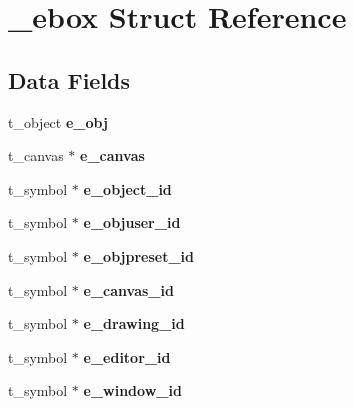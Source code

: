 \hypertarget{struct__ebox}{\section{\-\_\-ebox Struct Reference}
\label{struct__ebox}
}
\subsection*{Data Fields}
\begin{DoxyCompactItemize}
\item 
\hypertarget{struct__ebox_a337dd8dd1771ebe57e90886d4fdfe92d}{t\-\_\-object {\bfseries e\-\_\-obj}}\label{struct__ebox_a337dd8dd1771ebe57e90886d4fdfe92d}

\item 
\hypertarget{struct__ebox_ae2572dc1da66f274bc25b4bec1cbd08a}{t\-\_\-canvas $\ast$ {\bfseries e\-\_\-canvas}}\label{struct__ebox_ae2572dc1da66f274bc25b4bec1cbd08a}

\item 
\hypertarget{struct__ebox_a58e35b68d10bf20876e94cbb9bf8e8c4}{t\-\_\-symbol $\ast$ {\bfseries e\-\_\-object\-\_\-id}}\label{struct__ebox_a58e35b68d10bf20876e94cbb9bf8e8c4}

\item 
\hypertarget{struct__ebox_af4da8e9640bcf8e2be7004a5f0e0007c}{t\-\_\-symbol $\ast$ {\bfseries e\-\_\-objuser\-\_\-id}}\label{struct__ebox_af4da8e9640bcf8e2be7004a5f0e0007c}

\item 
\hypertarget{struct__ebox_a221f87b86e273092ba153465dbd8375f}{t\-\_\-symbol $\ast$ {\bfseries e\-\_\-objpreset\-\_\-id}}\label{struct__ebox_a221f87b86e273092ba153465dbd8375f}

\item 
\hypertarget{struct__ebox_afc954e0b6c201ccc39c6cbb4624b53b4}{t\-\_\-symbol $\ast$ {\bfseries e\-\_\-canvas\-\_\-id}}\label{struct__ebox_afc954e0b6c201ccc39c6cbb4624b53b4}

\item 
\hypertarget{struct__ebox_a4e3b02016162fde9b56c5402b2aa359c}{t\-\_\-symbol $\ast$ {\bfseries e\-\_\-drawing\-\_\-id}}\label{struct__ebox_a4e3b02016162fde9b56c5402b2aa359c}

\item 
\hypertarget{struct__ebox_acf74913773079d84226bf3e048a63cd9}{t\-\_\-symbol $\ast$ {\bfseries e\-\_\-editor\-\_\-id}}\label{struct__ebox_acf74913773079d84226bf3e048a63cd9}

\item 
\hypertarget{struct__ebox_ad3e9fa7a4d136c36050ad152665f91cd}{t\-\_\-symbol $\ast$ {\bfseries e\-\_\-window\-\_\-id}}\label{struct__ebox_ad3e9fa7a4d136c36050ad152665f91cd}


\end{DoxyCompactItemize}
